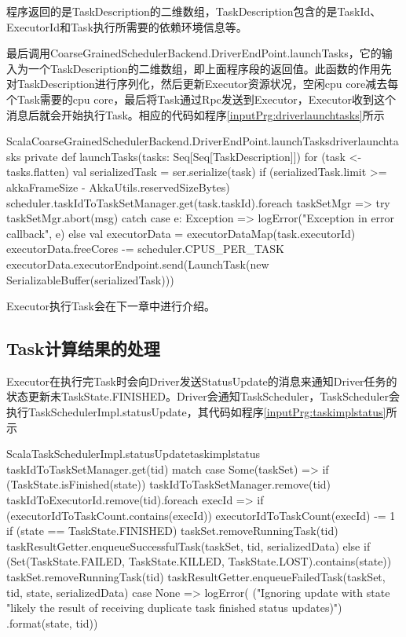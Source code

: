 程序返回的是TaskDescription的二维数组，TaskDescription包含的是TaskId、ExecutorId和Task执行所需要的依赖环境信息等。

最后调用CoarseGrainedSchedulerBackend.DriverEndPoint.launchTasks，它的输入为一个TaskDescription的二维数组，即上面程序段的返回值。此函数的作用先对TaskDescription进行序列化，然后更新Executor资源状况，空闲cpu core减去每个Task需要的cpu core，最后将Task通过Rpc发送到Executor，Executor收到这个消息后就会开始执行Task。相应的代码如程序\ref{inputPrg:driverlaunchtasks}所示
\begin{codeInput}{Scala}{CoarseGrainedSchedulerBackend.DriverEndPoint.launchTasks}{driverlaunchtasks}
private def launchTasks(tasks: Seq[Seq[TaskDescription]]) {
  for (task <- tasks.flatten) {
  val serializedTask = ser.serialize(task)
  if (serializedTask.limit >= akkaFrameSize - AkkaUtils.reservedSizeBytes) {
    scheduler.taskIdToTaskSetManager.get(task.taskId).foreach { taskSetMgr =>
    try {
      taskSetMgr.abort(msg)
    } catch {
      case e: Exception => logError("Exception in error callback", e)
    }
  }
  }
  else {
    val executorData = executorDataMap(task.executorId)
    executorData.freeCores -= scheduler.CPUS_PER_TASK
    executorData.executorEndpoint.send(LaunchTask(new SerializableBuffer(serializedTask)))
    }
  }
}
\end{codeInput}

Executor执行Task会在下一章中进行介绍。
\subsection{Task计算结果的处理}
\label{driverdealresult}
Executor在执行完Task时会向Driver发送StatusUpdate的消息来通知Driver任务的状态更新未TaskState.FINISHED。Driver会通知TaskScheduler，TaskScheduler会执行TaskSchedulerImpl.statusUpdate，其代码如程序\ref{inputPrg:taskimplstatus}所示
\begin{codeInput}{Scala}{TaskSchedulerImpl.statusUpdate}{taskimplstatus}
taskIdToTaskSetManager.get(tid) match {
  case Some(taskSet) => 
    if (TaskState.isFinished(state)) {
    taskIdToTaskSetManager.remove(tid)
    taskIdToExecutorId.remove(tid).foreach { execId =>
      if (executorIdToTaskCount.contains(execId)) {
        executorIdToTaskCount(execId) -= 1
     }
    }
  }
  if (state == TaskState.FINISHED) {
    taskSet.removeRunningTask(tid)
    taskResultGetter.enqueueSuccessfulTask(taskSet, tid, serializedData)
  } else if (Set(TaskState.FAILED, TaskState.KILLED, TaskState.LOST).contains(state)) {
    taskSet.removeRunningTask(tid)
    taskResultGetter.enqueueFailedTask(taskSet, tid, state, serializedData)
  }
  case None =>
    logError(
    ("Ignoring update with state %
    "likely the result of receiving duplicate task finished status updates)")
    .format(state, tid))
}
\end{codeInput}

